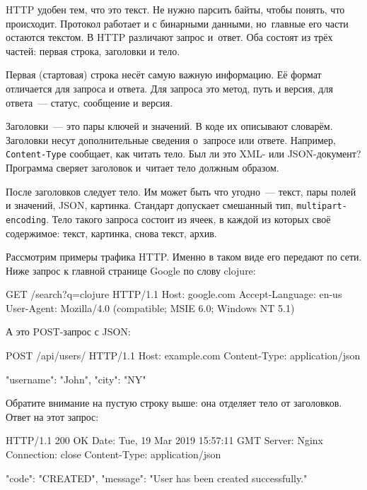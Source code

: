 HTTP удобен тем, что это текст. Не нужно парсить байты, чтобы понять, что
происходит. Протокол работает и с бинарными данными, но~главные его части
остаются текстом. В HTTP различают запрос и~ответ. Оба состоят из трёх частей:
первая строка, заголовки и тело.

Первая (стартовая) строка несёт самую важную информацию. Её формат отличается
для запроса и ответа. Для запроса это метод, путь и версия, для ответа~---
статус, сообщение и версия.


Заголовки~--- это пары ключей и значений. В коде их описывают словарём. Заголовки
несут дополнительные сведения о~запросе или ответе. Например,
\verb|Content-Type| сообщает, как читать тело. Был ли это XML- или
JSON-документ? Программа сверяет заголовок и~читает тело должным образом.

После заголовков следует тело. Им может быть что угодно~--- текст, пары полей и
значений, JSON, картинка. Стандарт допускает смешанный тип,
\verb|multipart-encoding|. Тело такого запроса состоит из ячеек, в каждой из
которых своё содержимое: текст, картинка, снова текст, архив.

Рассмотрим примеры трафика HTTP. Именно в таком виде его передают по сети. Ниже
запрос к главной странице Google по слову clojure:

\begin{english}
  \begin{http}
GET /search?q=clojure HTTP/1.1
Host: google.com
Accept-Language: en-us
User-Agent: Mozilla/4.0 (compatible; MSIE 6.0; Windows NT 5.1)
  \end{http}
\end{english}

А это POST-запрос с JSON:

\begin{english}
  \begin{http}
POST /api/users/ HTTP/1.1
Host: example.com
Content-Type: application/json

{"username": "John", "city": "NY"}
  \end{http}
\end{english}

Обратите внимание на пустую строку выше: она отделяет тело от заголовков. Ответ
на этот запрос:

\begin{english}
  \begin{http}
HTTP/1.1 200 OK
Date: Tue, 19 Mar 2019 15:57:11 GMT
Server: Nginx
Connection: close
Content-Type: application/json

{
  "code": "CREATED",
  "message": "User has been created successfully."
}
  \end{http}
\end{english}

